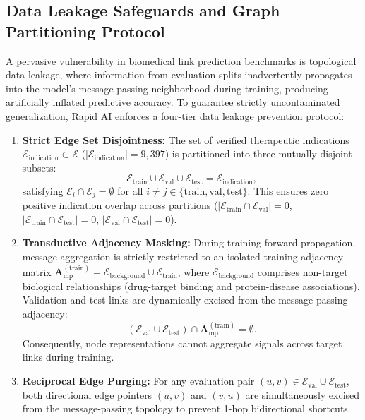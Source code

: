 \documentclass[conference,a4paper]{IEEEtran}
\begin{document}
\subsection{Data Leakage Safeguards and Graph Partitioning Protocol}
A pervasive vulnerability in biomedical link prediction benchmarks is topological data leakage, where information from evaluation splits inadvertently propagates into the model's message-passing neighborhood during training, producing artificially inflated predictive accuracy. To guarantee strictly uncontaminated generalization, Rapid AI enforces a four-tier data leakage prevention protocol:

\begin{enumerate}
    \item \textbf{Strict Edge Set Disjointness:} The set of verified therapeutic indications $\mathcal{E}_{\mathrm{indication}} \subset \mathcal{E}$ ($|\mathcal{E}_{\mathrm{indication}}| = 9,397$) is partitioned into three mutually disjoint subsets:
    \begin{equation}
        \mathcal{E}_{\mathrm{train}} \cup \mathcal{E}_{\mathrm{val}} \cup \mathcal{E}_{\mathrm{test}} = \mathcal{E}_{\mathrm{indication}},
    \end{equation}
    satisfying $\mathcal{E}_i \cap \mathcal{E}_j = \emptyset$ for all $i \neq j \in \{\mathrm{train}, \mathrm{val}, \mathrm{test}\}$. This ensures zero positive indication overlap across partitions ($|\mathcal{E}_{\mathrm{train}} \cap \mathcal{E}_{\mathrm{val}}| = 0$, $|\mathcal{E}_{\mathrm{train}} \cap \mathcal{E}_{\mathrm{test}}| = 0$, $|\mathcal{E}_{\mathrm{val}} \cap \mathcal{E}_{\mathrm{test}}| = 0$).
    \item \textbf{Transductive Adjacency Masking:} During training forward propagation, message aggregation is strictly restricted to an isolated training adjacency matrix $\mathbf{A}_{\mathrm{mp}}^{(\mathrm{train})} = \mathcal{E}_{\mathrm{background}} \cup \mathcal{E}_{\mathrm{train}}$, where $\mathcal{E}_{\mathrm{background}}$ comprises non-target biological relationships (drug-target binding and protein-disease associations). Validation and test links are dynamically excised from the message-passing adjacency:
    \begin{equation}
        (\mathcal{E}_{\mathrm{val}} \cup \mathcal{E}_{\mathrm{test}}) \cap \mathbf{A}_{\mathrm{mp}}^{(\mathrm{train})} = \emptyset.
    \end{equation}
    Consequently, node representations cannot aggregate signals across target links during training.
    \item \textbf{Reciprocal Edge Purging:} For any evaluation pair $(u, v) \in \mathcal{E}_{\mathrm{val}} \cup \mathcal{E}_{\mathrm{test}}$, both directional edge pointers $(u, v)$ and $(v, u)$ are simultaneously excised from the message-passing topology to prevent 1-hop bidirectional shortcuts.

\end{enumerate}
\end{document}
